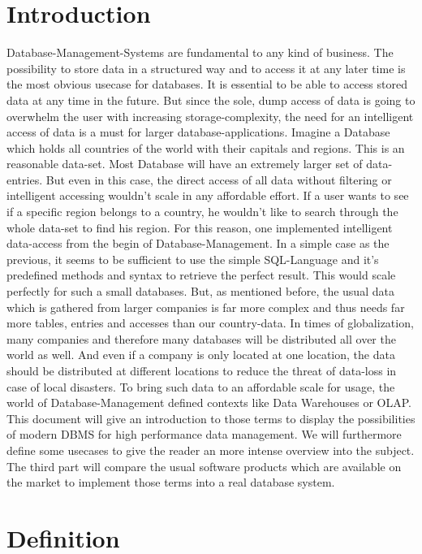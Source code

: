 \documentclass[12pt,a4paper,oneside, 
liststotoc, 					%
bibtotoc,						%
titlepage, 						%
headsepline, 					%
BCOR6mm,						%
openany,							%
]{scrreprt}
\begin{document}
\chapter{Introduction}
Database-Management-Systems are fundamental to any kind of business. The possibility to store data in a structured way and to access it at any later time is the most obvious usecase for databases. It is essential to be able to access stored data at any time in the future. But since the sole, dump access of data is going to overwhelm the user with increasing storage-complexity, the need for an intelligent access of data is a must for larger database-applications. Imagine a Database which holds all countries of the world with their capitals and regions. This is an reasonable data-set. Most Database will have an extremely larger set of data-entries. But even in this case, the direct access of all data without filtering or intelligent accessing wouldn't scale in any affordable effort. If a user wants to see if a specific region belongs to a country, he wouldn't like to search through the whole data-set to find his region. For this reason, one implemented intelligent data-access from the begin of Database-Management. In a simple case as the previous, it seems to be sufficient to use the simple SQL-Language and it's predefined methods and syntax to retrieve the perfect result. This would scale perfectly for such a small databases. But, as mentioned before, the usual data which is gathered from larger companies is far more complex and thus needs far more tables, entries and accesses than our country-data. In times of globalization, many companies and therefore many databases will be distributed all over the world as well. And even if a company is only located at one location, the data should be distributed at different locations to reduce the threat of data-loss in case of local disasters. To bring such data to an affordable scale for usage, the world of Database-Management defined contexts like Data Warehouses or OLAP. This document will give an introduction to those terms to display the possibilities of modern DBMS for high performance data management. We will furthermore define some usecases to give the reader an more intense overview into the subject. The third part will compare the usual software products which are available on the market to implement those terms into a real database system. 
\chapter{ Definition }\label{definition}
\end{document}
